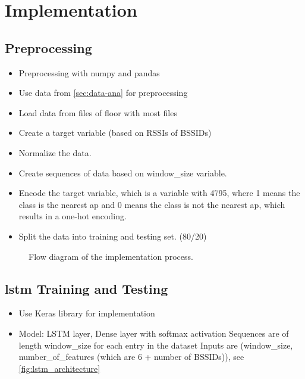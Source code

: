 \chapter{Implementation}

\section{Preprocessing}
\begin{itemize}
    \item Preprocessing with numpy and pandas
    \item Use data from \cref{sec:data-ana} for preprocessing
    \item Load data from files of floor with most files
    \item Create a target variable (based on RSSIs of BSSIDs)
    \item Normalize the data.
    \item Create sequences of data based on window\_size variable.
    \item Encode the target variable, which is a variable with 4795, where 1 means the class is the nearest \ac{ap} and 0 means the class is not the nearest \ac{ap}, which results in a one-hot encoding.
    \item Split the data into training and testing set. (80/20)
\end{itemize}

\begin{figure}[h!]
    \centering
    
    \caption{Flow diagram of the implementation process.}
    \label{fig:flow_diagram}
\end{figure} 

\section{\ac{lstm} Training and Testing}
\begin{itemize}
    \item Use Keras library for implementation \cite{keras}
    \item Model: LSTM layer, Dense layer with softmax activation
    \subitem Sequences are of length window\_size for each entry in the dataset
    \subitem Inputs are (window\_size, number\_of\_features (which are 6 + number of BSSIDs)), see \cref{fig:lstm_architecture}
\end{itemize}

